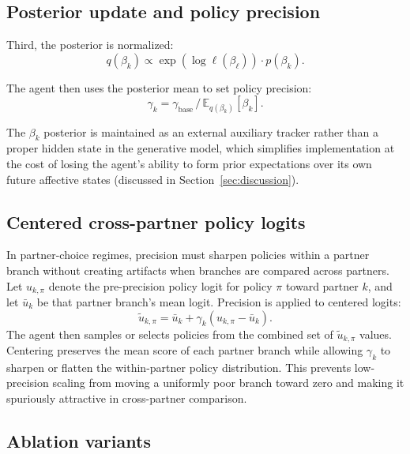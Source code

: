 \subsection{Posterior update and policy precision}

Third, the posterior is normalized:
\begin{equation}
q(\beta_k) \propto \exp\left(\log \ell(\beta_\ell)\right) \cdot p(\beta_k).
\label{eq:beta_posterior}
\end{equation}

The agent then uses the posterior mean to set policy precision:
\begin{equation}
\gamma_k = \gamma_{\text{base}} \,/\, \mathbb{E}_{q(\beta_k)}[\beta_k].
\label{eq:gamma_update_appendix}
\end{equation}

The $\beta_k$ posterior is maintained as an external auxiliary tracker rather than a proper hidden state in the generative model, which simplifies implementation at the cost of losing the agent's ability to form prior expectations over its own future affective states (discussed in Section~\ref{sec:discussion}).

\subsection{Centered cross-partner policy logits}

In partner-choice regimes, precision must sharpen policies within a partner branch without creating artifacts when branches are compared across partners. Let $u_{k,\pi}$ denote the pre-precision policy logit for policy $\pi$ toward partner $k$, and let $\bar{u}_k$ be that partner branch's mean logit. Precision is applied to centered logits:
\begin{equation}
\tilde{u}_{k,\pi} = \bar{u}_k + \gamma_k\left(u_{k,\pi} - \bar{u}_k\right).
\label{eq:centered_logits}
\end{equation}
The agent then samples or selects policies from the combined set of $\tilde{u}_{k,\pi}$ values. Centering preserves the mean score of each partner branch while allowing $\gamma_k$ to sharpen or flatten the within-partner policy distribution. This prevents low-precision scaling from moving a uniformly poor branch toward zero and making it spuriously attractive in cross-partner comparison.

\subsection{Ablation variants}

